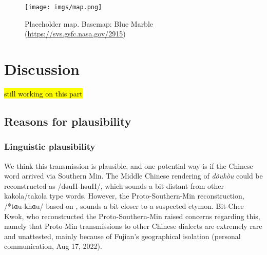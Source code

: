 \documentclass[12pt]{article}
\begin{document}


\begin{figure}[h]
    \centering
    \texttt{[image: imgs/map.png]}
    \caption{Placeholder map. Basemap: Blue Marble (\url{https://svs.gsfc.nasa.gov/2915})}
    \label{fig:map}
\end{figure}


\section{Discussion}

\hl{still working on this part}

\subsection{Reasons for plausibility}

\subsubsection{Linguistic plausibility}

We think this transmission is plausible, and one potential way is if the Chinese word arrived via Southern Min. The Middle Chinese rendering of \textit{dòukòu} could be reconstructed as /dəuH-həuH/, which sounds a bit distant from other kakola/takola type words. However, the Proto-Southern-Min reconstruction, /*tɑu-khɑu/ based on \textcite{kwok_2018_southern}, sounds a bit closer to a suspected etymon. Bit-Chee Kwok, who reconstructed the Proto-Southern-Min raised concerns regarding this, namely that Proto-Min transmissions to other Chinese dialects are extremely rare and unattested, mainly because of Fujian's geographical isolation (personal communication, Aug 17, 2022).
\end{document}
